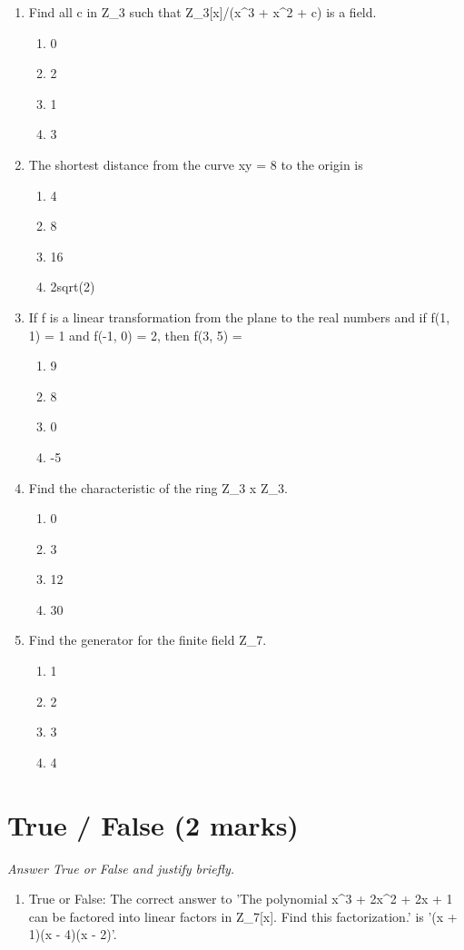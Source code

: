 \documentclass[12pt]{article}
\begin{document}
\begin{enumerate}[label=\arabic*.]
\item Find all c in Z\_3 such that Z\_3[x]/(x\^{}3 + x\^{}2 + c) is a field.
\begin{enumerate}[label=(\alph*)]
    \item 0
    \item 2
    \item 1
    \item 3
\end{enumerate}
\item The shortest distance from the curve xy = 8 to the origin is
\begin{enumerate}[label=(\alph*)]
    \item 4
    \item 8
    \item 16
    \item 2sqrt(2)
\end{enumerate}
\item If f is a linear transformation from the plane to the real numbers and if f(1, 1) = 1 and f(-1, 0) = 2, then f(3, 5) =
\begin{enumerate}[label=(\alph*)]
    \item 9
    \item 8
    \item 0
    \item -5
\end{enumerate}
\item Find the characteristic of the ring Z\_3 x Z\_3.
\begin{enumerate}[label=(\alph*)]
    \item 0
    \item 3
    \item 12
    \item 30
\end{enumerate}
\item Find the generator for the finite field Z\_7.
\begin{enumerate}[label=(\alph*)]
    \item 1
    \item 2
    \item 3
    \item 4
\end{enumerate}
\end{enumerate}

\section*{True / False (2 marks)}
\textit{Answer True or False and justify briefly.}
\begin{enumerate}[label=\arabic*.]
\item True or False: The correct answer to 'The polynomial x\^{}3 + 2x\^{}2 + 2x + 1 can be factored into linear factors in Z\_7[x]. Find this factorization.' is '(x + 1)(x - 4)(x - 2)'.
\end{enumerate}
\end{document}
